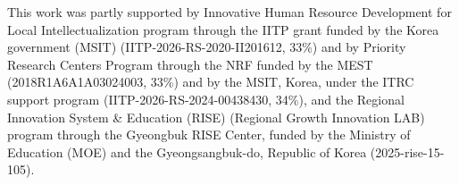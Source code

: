 \documentclass[5p,times,twocolumn]{elsarticle}
\begin{document}
This work was partly supported by Innovative Human Resource Development for Local Intellectualization program through the IITP grant funded by the Korea government (MSIT) (IITP-2026-RS-2020-II201612, 33\%) and by Priority Research Centers Program through the NRF funded by the MEST (2018R1A6A1A03024003, 33\%) and by the MSIT, Korea, under the ITRC support program (IITP-2026-RS-2024-00438430, 34\%),  and the Regional Innovation System \& Education (RISE) (Regional Growth Innovation LAB) program through the Gyeongbuk RISE Center, funded by the Ministry of Education (MOE) and the Gyeongsangbuk-do, Republic of Korea (2025-rise-15-105).


\small

\vspace{-0.3cm}

\vspace{-0.3cm}
\end{document}
